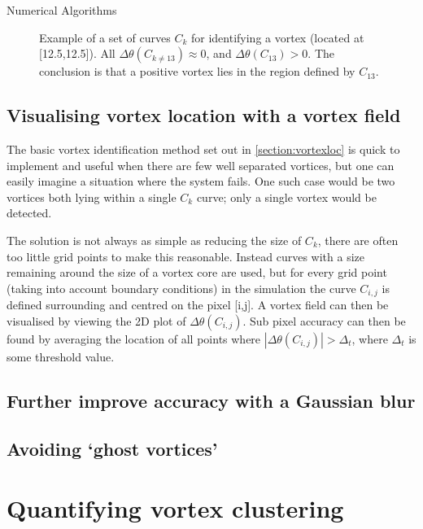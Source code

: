 \begin{chapter}{\label{cha:numerics}Numerical Algorithms}
\begin{figure}
  \caption{Example of a set of curves $C_k$ for identifying a vortex (located at [12.5,12.5]). All $\Delta\theta(C_{k\neq13})\approx0$, and $\Delta\theta(C_{13})>0$. The conclusion is that a positive vortex lies in the region defined by $C_{13}$.}
 \end{figure}
\subsection{\label{section:vortexloc} Visualising vortex location with a vortex field}
The basic vortex identification method set out in \ref{section:vortexloc} is quick to implement and useful when there are few well separated vortices, but one can easily imagine a situation where the system fails. One such case would be two vortices both lying within a single $C_k$ curve; only a single vortex would be detected.

The solution is not always as simple as reducing the size of $C_k$, there are often too little grid points to make this reasonable. Instead curves with a size remaining around the size of a vortex core are used, but for every grid point (taking into account boundary conditions) in the simulation the curve $C_{i,j}$ is defined surrounding and centred on the pixel [i,j]. A vortex field can then be visualised by viewing the 2D plot of $\Delta\theta(C_{i,j})$. Sub pixel accuracy can then be found by averaging the location of all points where $|\Delta\theta(C_{i,j})|>\Delta_t$, where $\Delta_t$ is some threshold value.
\subsection{\label{section:gaussianblur} Further improve accuracy with a Gaussian blur}
\subsection{\label{section:ghostvortex} Avoiding `ghost vortices'}


\section{\label{section:vortexclustering} Quantifying vortex clustering}

\end{chapter}
